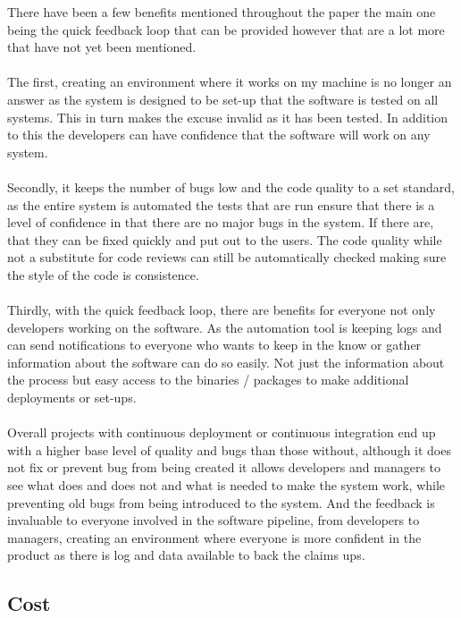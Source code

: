 There have been a few benefits mentioned throughout the paper the main one being the quick feedback loop that can be provided however that are a lot more that have not yet been mentioned.
\\\\
The first, creating an environment where it works on my machine is no longer an answer as the system is designed to be set-up that the software is tested on all systems. This in turn makes the excuse invalid as it has been tested. In addition to this the developers can have confidence that the software will work on any system.
\\\\
Secondly, it keeps the number of bugs low and the code quality to a set standard,  as the entire system is automated the tests that are run ensure that there is a level of confidence in that there are no major bugs in the system. If there are, that they can be fixed quickly and put out to the users. The code quality while not a substitute for code reviews can still be automatically checked making sure the style of the code is consistence. 
\\\\
Thirdly, with the quick feedback loop, there are benefits for everyone not only developers working on the software. As the automation tool is keeping logs and can send notifications to everyone who wants to keep in the know or gather information about the software can do so easily. Not just the information about the process but easy access to the binaries / packages to make additional deployments or set-ups.
\\\\
Overall projects with continuous deployment or continuous integration end up with a higher base level of quality and bugs than those without, although it does not fix or prevent bug from being created it allows developers and managers to see what does and does not and what is needed to make the system work, while preventing old bugs from being introduced to the system. And the feedback is invaluable to everyone involved in the software pipeline, from developers to managers, creating an environment where everyone is more confident in the product as there is log and data available to back the claims ups.


\subsection{Cost}

